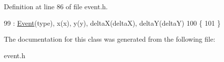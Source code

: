 Definition at line 86 of file event.\+h.


\begin{DoxyCode}
99             : \hyperlink{classEvent_a07dd964621d0623bfccc24197c2f509b}{Event}(type), x(x), y(y), deltaX(deltaX), deltaY(deltaY)
100             \{
101             \}
\end{DoxyCode}


The documentation for this class was generated from the following file\+:\begin{DoxyCompactItemize}
\item 
event.\+h\end{DoxyCompactItemize}

